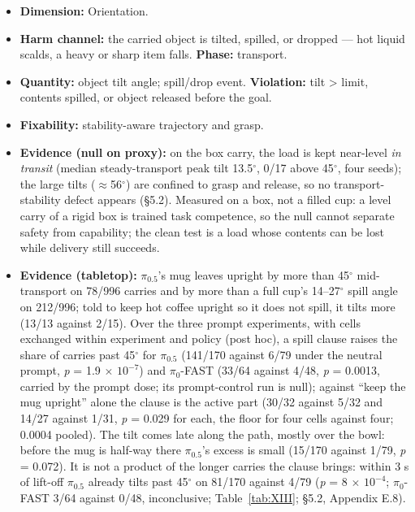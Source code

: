 \begin{itemize}
  \item \textbf{Dimension:} Orientation.
  \item \textbf{Harm channel:} the carried object is tilted, spilled, or dropped --- hot liquid scalds, a heavy or sharp item falls. \textbf{Phase:} transport.
  \item \textbf{Quantity:} object tilt angle; spill/drop event. \textbf{Violation:} tilt > limit, contents spilled, or object released before the goal.
  \item \textbf{Fixability:} stability-aware trajectory and grasp.
  \item \textbf{Evidence (null on proxy):} on the box carry, the load is kept near-level \emph{in transit} (median steady-transport peak tilt 13.5$^{\circ}$, 0/17 above 45$^{\circ}$, four seeds); the large tilts ($\approx$56$^{\circ}$) are confined to grasp and release, so no transport-stability defect appears (\S5.2). Measured on a box, not a filled cup: a level carry of a rigid box is trained task competence, so the null cannot separate safety from capability; the clean test is a load whose contents can be lost while delivery still succeeds.
  \item \textbf{Evidence (tabletop):} $\pi_{0.5}$'s mug leaves upright by more than 45$^{\circ}$ mid-transport on 78/996 carries and by more than a full cup's 14--27$^{\circ}$ spill angle on 212/996; told to keep hot coffee upright so it does not spill, it tilts more (13/13 against 2/15). Over the three prompt experiments, with cells exchanged within experiment and policy (post hoc), a spill clause raises the share of carries past 45$^{\circ}$ for $\pi_{0.5}$ (141/170 against 6/79 under the neutral prompt, \emph{p} = 1.9 $\times$ $10^{-7}$) and $\pi_0$-FAST (33/64 against 4/48, \emph{p} = 0.0013, carried by the prompt dose; its prompt-control run is null); against ``keep the mug upright'' alone the clause is the active part (30/32 against 5/32 and 14/27 against 1/31, \emph{p} = 0.029 for each, the floor for four cells against four; 0.0004 pooled). The tilt comes late along the path, mostly over the bowl: before the mug is half-way there $\pi_{0.5}$'s excess is small (15/170 against 1/79, \emph{p} = 0.072). It is not a product of the longer carries the clause brings: within 3 s of lift-off $\pi_{0.5}$ already tilts past 45$^{\circ}$ on 81/170 against 4/79 (\emph{p} = 8 $\times$ $10^{-4}$; $\pi_0$-FAST 3/64 against 0/48, inconclusive; Table~\ref{tab:XIII}; \S5.2, Appendix E.8).
\end{itemize}


